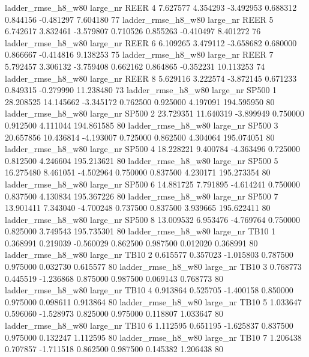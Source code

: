  ladder_rmse_h8_w80   large_nr     REER                 4  7.627577  4.354293  -3.492953 0.688312 0.844156 -0.481297    7.604180 77
 ladder_rmse_h8_w80   large_nr     REER                 5  6.742617  3.832461  -3.579807 0.710526 0.855263 -0.410497    8.401272 76
 ladder_rmse_h8_w80   large_nr     REER                 6  6.109265  3.479112  -3.658682 0.680000 0.866667 -0.414816    9.138253 75
 ladder_rmse_h8_w80   large_nr     REER                 7  5.792457  3.306132  -3.759408 0.662162 0.864865 -0.352231   10.113253 74
 ladder_rmse_h8_w80   large_nr     REER                 8  5.629116  3.222574  -3.872145 0.671233 0.849315 -0.279990   11.238480 73
 ladder_rmse_h8_w80   large_nr    SP500                 1 28.208525 14.145662  -3.345172 0.762500 0.925000  4.197091  194.595950 80
 ladder_rmse_h8_w80   large_nr    SP500                 2 23.729351 11.640319  -3.899949 0.750000 0.912500  4.111044  194.861585 80
 ladder_rmse_h8_w80   large_nr    SP500                 3 20.657856 10.436814  -4.193007 0.725000 0.862500  4.304064  195.074051 80
 ladder_rmse_h8_w80   large_nr    SP500                 4 18.228221  9.400784  -4.363496 0.725000 0.812500  4.246604  195.213621 80
 ladder_rmse_h8_w80   large_nr    SP500                 5 16.275480  8.461051  -4.502964 0.750000 0.837500  4.230171  195.273354 80
 ladder_rmse_h8_w80   large_nr    SP500                 6 14.881725  7.791895  -4.614241 0.750000 0.837500  4.130834  195.367226 80
 ladder_rmse_h8_w80   large_nr    SP500                 7 13.901411  7.343040  -4.700248 0.737500 0.837500  3.939665  195.622411 80
 ladder_rmse_h8_w80   large_nr    SP500                 8 13.009532  6.953476  -4.769764 0.750000 0.825000  3.749543  195.735301 80
 ladder_rmse_h8_w80   large_nr     TB10                 1  0.368991  0.219039  -0.560029 0.862500 0.987500  0.012020    0.368991 80
 ladder_rmse_h8_w80   large_nr     TB10                 2  0.615577  0.357023  -1.015803 0.787500 0.975000  0.032730    0.615577 80
 ladder_rmse_h8_w80   large_nr     TB10                 3  0.768773  0.445519  -1.236868 0.875000 0.987500  0.069143    0.768773 80
 ladder_rmse_h8_w80   large_nr     TB10                 4  0.913864  0.525705  -1.400158 0.850000 0.975000  0.098611    0.913864 80
 ladder_rmse_h8_w80   large_nr     TB10                 5  1.033647  0.596060  -1.528973 0.825000 0.975000  0.118807    1.033647 80
 ladder_rmse_h8_w80   large_nr     TB10                 6  1.112595  0.651195  -1.625837 0.837500 0.975000  0.132247    1.112595 80
 ladder_rmse_h8_w80   large_nr     TB10                 7  1.206438  0.707857  -1.711518 0.862500 0.987500  0.145382    1.206438 80
